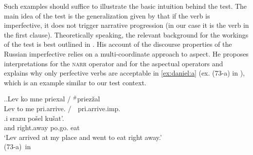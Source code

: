 Such examples should suffice to illustrate the basic intuition behind the test. The main idea of the test is the generalization given by \citet{Jespersen:24} that if the verb is imperfective, it does not trigger narrative progression (in our case it is the verb in the first clause). Theoretically speaking, the relevant background for the workings of the test is best outlined in \citet{Altshuler:12}.
His account of the discourse properties of the Russian imperfective  relies on a multi-coordinate approach to aspect. He proposes interpretations for the \textsc{narr} operator and for the aspectual operators and explains why only perfective verbs are acceptable in \ref{ex:daniel:a} (ex. (73-a) in \citealt{Altshuler:12}), which is an example similar to our test context.

\ex.\label{ex:daniel}\ag.\label{ex:daniel:a}Lev ko mne \textsuperscript{\JudgeOK}priexal\textsuperscript{\PF} / {{$^{\#}$}priez\v{z}al\textsuperscript{\IPF}}\\
Lev to me {pri.arrive.} / {{\textcolor{white} {$^{\#}$}}pri.arrive.imp.}\\
\bg.i srazu po\v{s}el\textsuperscript{\PF} ku\v{s}at'.\\
and right.away po.go. eat\\
\trans `Lev arrived at my place and went to eat right away.'\\
\hbox{}\hfill\hbox{(73-a) in \citealt{Altshuler:12}}


